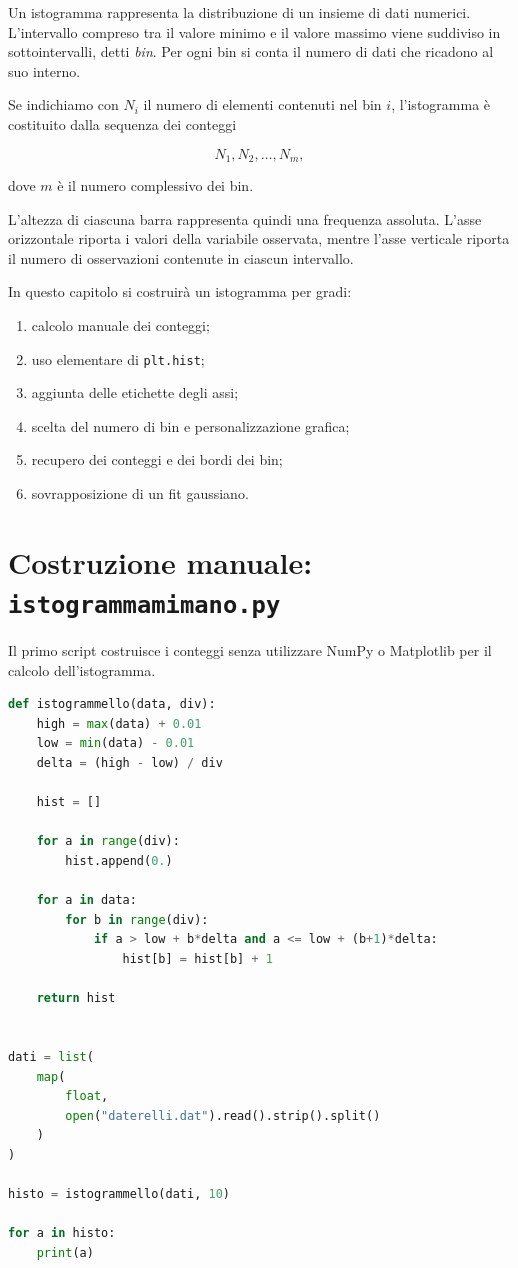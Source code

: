 \documentclass[11pt,a4paper]{book}
\begin{document}
Un istogramma rappresenta la distribuzione di un insieme di dati numerici.
L'intervallo compreso tra il valore minimo e il valore massimo viene
suddiviso in sottointervalli, detti \emph{bin}. Per ogni bin si conta il
numero di dati che ricadono al suo interno.

Se indichiamo con $N_i$ il numero di elementi contenuti nel bin $i$,
l'istogramma è costituito dalla sequenza dei conteggi

\[
N_1,N_2,\ldots,N_m,
\]

dove $m$ è il numero complessivo dei bin.

L'altezza di ciascuna barra rappresenta quindi una frequenza assoluta.
L'asse orizzontale riporta i valori della variabile osservata, mentre
l'asse verticale riporta il numero di osservazioni contenute in ciascun
intervallo.

In questo capitolo si costruirà un istogramma per gradi:

\begin{enumerate}
    \item calcolo manuale dei conteggi;
    \item uso elementare di \texttt{plt.hist};
    \item aggiunta delle etichette degli assi;
    \item scelta del numero di bin e personalizzazione grafica;
    \item recupero dei conteggi e dei bordi dei bin;
    \item sovrapposizione di un fit gaussiano.
\end{enumerate}

\section{Costruzione manuale: \texttt{istogrammamimano.py}}

Il primo script costruisce i conteggi senza utilizzare NumPy o
Matplotlib per il calcolo dell'istogramma.

\begin{lstlisting}[language=Python]
def istogrammello(data, div):
    high = max(data) + 0.01
    low = min(data) - 0.01
    delta = (high - low) / div

    hist = []

    for a in range(div):
        hist.append(0.)

    for a in data:
        for b in range(div):
            if a > low + b*delta and a <= low + (b+1)*delta:
                hist[b] = hist[b] + 1

    return hist


dati = list(
    map(
        float,
        open("daterelli.dat").read().strip().split()
    )
)

histo = istogrammello(dati, 10)

for a in histo:
    print(a)
\end{lstlisting}
\end{document}
